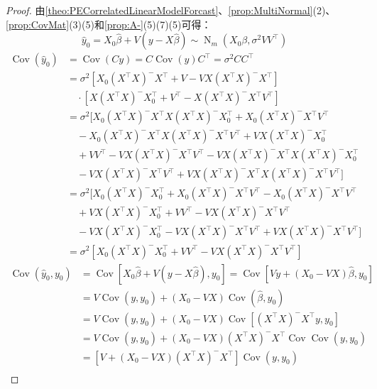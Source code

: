 \begin{proof}
	由\cref{theo:PECorrelatedLinearModelForcast}、\cref{prop:MultiNormal}(2)、\cref{prop:CovMat}(3)(5)和\cref{prop:A-}(5)(7)(5)可得：
	\begin{equation*}
		\hat{y}_0=X_0\hat{\beta}+V(y-X\hat{\beta})\sim\operatorname{N}_m(X_0\beta,\sigma^2VV^{\top})
	\end{equation*}
	\begin{align*}
		\operatorname{Cov}(\hat{y}_0)&=\operatorname{Cov}(Cy)=C\operatorname{Cov}(y)C^{\top}=\sigma^2CC^{\top} \\
		&=\sigma^2[X_0(X^{\top}X)^-X^{\top}+V-VX(X^{\top}X)^-X^{\top}] \\
		&\quad\cdot[X(X^{\top}X)^-X_0^{\top}+V^{\top}-X(X^{\top}X)^-X^{\top}V^{\top}] \\
		&=\sigma^2[X_0(X^{\top}X)^-X^{\top}X(X^{\top}X)^-X_0^{\top}+X_0(X^{\top}X)^-X^{\top}V^{\top} \\
		&\quad-X_0(X^{\top}X)^-X^{\top}X(X^{\top}X)^-X^{\top}V^{\top}+VX(X^{\top}X)^-X_0^{\top} \\
		&\quad+VV^{\top}-VX(X^{\top}X)^-X^{\top}V^{\top}-VX(X^{\top}X)^-X^{\top}X(X^{\top}X)^-X_0^{\top} \\
		&\quad-VX(X^{\top}X)^-X^{\top}V^{\top}+VX(X^{\top}X)^-X^{\top}X(X^{\top}X)^-X^{\top}V^{\top}] \\
		&=\sigma^2[X_0(X^{\top}X)^-X_0^{\top}+X_0(X^{\top}X)^-X^{\top}V^{\top}-X_0(X^{\top}X)^-X^{\top}V^{\top} \\
		&\quad+VX(X^{\top}X)^-X_0^{\top}+VV^{\top}-VX(X^{\top}X)^-X^{\top}V^{\top} \\
		&\quad-VX(X^{\top}X)^-X_0^{\top}-VX(X^{\top}X)^-X^{\top}V^{\top}+VX(X^{\top}X)^-X^{\top}V^{\top}] \\
		&=\sigma^2[X_0(X^{\top}X)^-X_0^{\top}+VV^{\top}-VX(X^{\top}X)^-X^{\top}V^{\top}]
	\end{align*}
	\begin{align*}
		\operatorname{Cov}(\hat{y}_0,y_0)
		&=\operatorname{Cov}[X_0\hat{\beta}+V(y-X\hat{\beta}),y_0]=\operatorname{Cov}[Vy+(X_0-VX)\hat{\beta},y_0] \\
		&=V\operatorname{Cov}(y,y_0)+(X_0-VX)\operatorname{Cov}(\hat{\beta},y_0) \\
		&=V\operatorname{Cov}(y,y_0)+(X_0-VX)\operatorname{Cov}[(X^{\top}X)^-X^{\top}y,y_0] \\
		&=V\operatorname{Cov}(y,y_0)+(X_0-VX)(X^{\top}X)^-X^{\top}\operatorname{Cov}\operatorname{Cov}(y,y_0) \\
		&=[V+(X_0-VX)(X^{\top}X)^-X^{\top}]\operatorname{Cov}(y,y_0) \\

\end{align*}
\end{proof}
